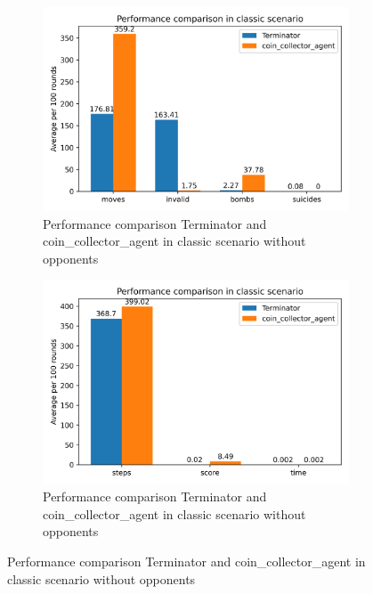 \documentclass[
	letterpaper, %
	12pt, %
]{CSUniSchoolLabReport}
\begin{document}
\begin{figure}

	\begin{subfigure}{\textwidth}
		\includegraphics[scale=0.6]{Figures/Task2-1.png}
		\caption{Performance comparison Terminator and coin\_collector\_agent in classic scenario without opponents}
		\label{img:Task2-1}
	\end{subfigure}


	\begin{subfigure}{\textwidth}
		\includegraphics[scale=0.6]{Figures/Task2-2.png}
		\caption{Performance comparison Terminator and coin\_collector\_agent in classic scenario without opponents}
		\label{img:Task2-2}
	\end{subfigure}

	\caption{Performance comparison Terminator and coin\_collector\_agent in classic scenario without opponents}
	\label{img:Task2}
\end{figure}
\end{document}
